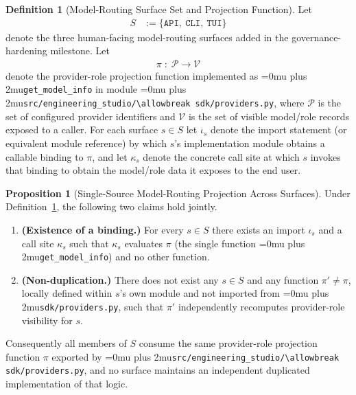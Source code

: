 \documentclass[12pt]{article}
\theoremstyle{definition}
\newtheorem{definition}[theorem]{Definition}
\newtheorem{proposition}[theorem]{Proposition}
\DeclareRobustCommand{\code}[1]{\begingroup\Urlmuskip=0mu plus 2mu\relax\nolinkurl{#1}\endgroup}
\begin{document}
\begin{definition}[Model-Routing Surface Set and Projection Function]
\label{def:model-routing-surfaces}
Let
\begin{align}
  S &:= \{\texttt{API},\ \texttt{CLI},\ \texttt{TUI}\}
\end{align}
denote the three human-facing model-routing surfaces added in the
governance-hardening milestone. Let
\begin{align}
  \pi \;:\; \mathcal{P} \to \mathcal{V}
\end{align}
denote the provider-role projection function implemented as
\code{get\_model\_info} in module
\code{src/engineering\_studio/\allowbreak sdk/providers.py}, where
$\mathcal{P}$ is the set of configured provider identifiers and
$\mathcal{V}$ is the set of visible model/role records exposed to a
caller. For each surface $s \in S$ let $\iota_s$ denote the import
statement (or equivalent module reference) by which $s$'s
implementation module obtains a callable binding to $\pi$, and let
$\kappa_s$ denote the concrete call site at which $s$ invokes that
binding to obtain the model/role data it exposes to the end user.
\end{definition}

\begin{proposition}[Single-Source Model-Routing Projection Across Surfaces]
\label{prop:single-source-model-routing}
Under Definition~\ref{def:model-routing-surfaces}, the following two
claims hold jointly.
\begin{enumerate}
  \item \textbf{(Existence of a binding.)} For every $s \in S$ there
  exists an import $\iota_s$ and a call site $\kappa_s$ such that
  $\kappa_s$ evaluates $\pi$ (the single function
  \code{get\_model\_info}) and no other function.

  \item \textbf{(Non-duplication.)} There does not exist any $s \in S$
  and any function $\pi' \neq \pi$, locally defined within $s$'s own
  module and not imported from \code{sdk/providers.py}, such that
  $\pi'$ independently recomputes provider-role visibility for $s$.
\end{enumerate}
Consequently all members of $S$ consume the same provider-role
projection function $\pi$ exported by
\code{src/engineering\_studio/\allowbreak sdk/providers.py}, and no
surface maintains an independent duplicated implementation of that
logic.
\end{proposition}
\end{document}
